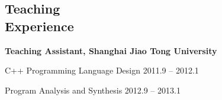 \documentclass[margin, line, 11pt]{resume}
\begin{document}
\begin{resume}
    \section{\mysidestyle Teaching \\Experience}
    \textbf{Teaching Assistant, Shanghai Jiao Tong University}
    \begin{list2}
        \item C++ Programming Language Design \hfill 2011.9 -- 2012.1
        \item Program Analysis and Synthesis \hfill 2012.9 -- 2013.1
    \end{list2}




\end{resume}
\end{document}
